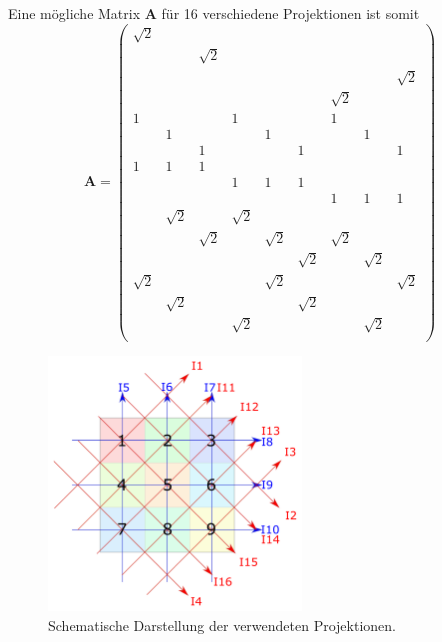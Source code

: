 Eine mögliche Matrix $\mathbf{A}$ für 16 verschiedene Projektionen ist somit
\[
\mathrm{\textbf{A}} = \left(
\begin{matrix}
\sqrt{2} &  &  &  &  &  &  &  & \\
 &  & \sqrt{2} &  &  &  &  &  & \\
 &  &  &  &  &  &  &  & \sqrt{2}\\
 &  &  &  &  &  & \sqrt{2} &  &\\
1 &  &  & 1 &  &  & 1 &  &  \\
 & 1 &  &  & 1 &  &  & 1 &  \\
 &  & 1 &  &  & 1 &  &  & 1 \\
1 & 1 & 1 &  &  &  &  &  &  \\
 &  &  & 1 & 1 & 1 &  &  &  \\
 &  &  &  &  &  & 1 & 1 & 1 \\
 & \sqrt{2} &  & \sqrt{2} &  &  &  &  &  \\
 &  & \sqrt{2} &  & \sqrt{2} &  & \sqrt{2} &  &  \\
 &  &  &  &  & \sqrt{2} &  & \sqrt{2} &  \\
\sqrt{2} &  &  &  & \sqrt{2} &  &  &  & \sqrt{2} \\
 & \sqrt{2} &  &  &  & \sqrt{2} &  &  &  \\
 &  &  & \sqrt{2} &  &  &  & \sqrt{2} &  \\
\end{matrix}
\right)
\]

\begin{figure}
\centering
\includegraphics[keepaspectratio,width=0.6\textwidth]{content/images/Zeichnung.pdf}
\caption{Schematische Darstellung der verwendeten Projektionen.}
\label{fig:aufbau}
\end{figure}

